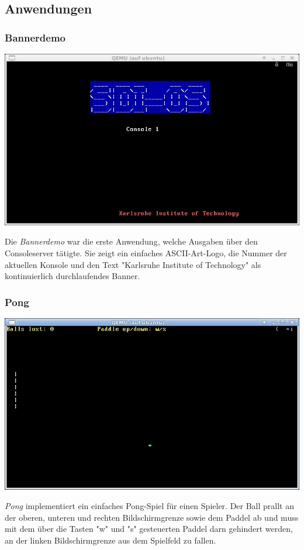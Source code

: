 \subsection{Anwendungen}

\subsubsection{Bannerdemo}

\begin{center}
\includegraphics[scale=0.65]{bannerdemo}
\end{center}

Die \textit{Bannerdemo} war die erste Anwendung, welche Ausgaben über den Consoleserver tätigte. Sie zeigt ein einfaches ASCII-Art-Logo, die Nummer der aktuellen Konsole und den Text "Karlsruhe Institute of Technology" als kontinuierlich durchlaufendes Banner.

\subsubsection{Pong}

\begin{center}
\includegraphics[scale=0.65]{pong}
\end{center}

\textit{Pong} implementiert ein einfaches Pong-Spiel für einen Spieler. Der Ball prallt an der oberen, unteren und rechten Bildschirmgrenze sowie dem Paddel ab und muss mit dem über die Tasten "w" und "s" gesteuerten Paddel darn gehindert werden, an der linken Bildschirmgrenze aus dem Spielfeld zu fallen.